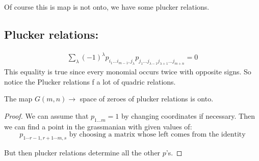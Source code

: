 Of course this is map is not onto, we have some plucker relations.


\subsection{Plucker relations:}


\begin{align*}
    \sum_\lambda  (-1)^\lambda p_{i_1\ldots i_{m-1},j_\lambda} p_{j_1\ldots j_{\lambda-1}j_{\lambda+1}\ldots j_{m+n}} = 0
\end{align*}
This equality is true since every monomial occurs twice with opposite signs. So notice the Plucker relations f a lot of quadric relations.

\begin{theorem}
    The map $G(m,n) \rightarrow $ space of zeroes of plucker relations is onto.

    \begin{proof}
        We can assume that $p_{1\dots m} = 1$ by changing coordinates if necessary. Then we can find a point in the grassmanian with given values of:\[p_{1\cdots r-1,r+1\cdots m,s} \text{ by choosing a matrix whose left comes from the identity}\]

        But then plucker relations determine all the other $p$'s.
    \end{proof}
\end{theorem}

